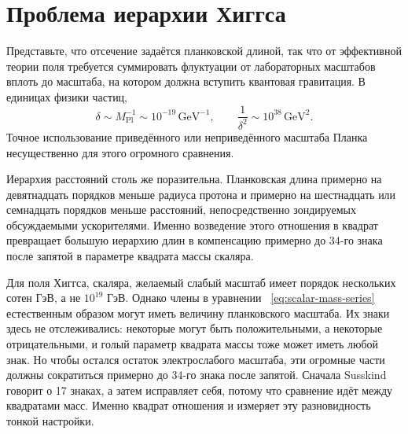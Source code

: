 \section{Проблема иерархии Хиггса}

Представьте, что отсечение задаётся планковской длиной, так что от эффективной теории поля требуется суммировать флуктуации от лабораторных масштабов вплоть до масштаба, на котором должна вступить квантовая гравитация.
В единицах физики частиц,
\begin{equation}
\delta\sim M_{\mathrm{Pl}}^{-1}\sim10^{-19}\,\mathrm{GeV}^{-1},
\qquad
\frac{1}{\delta^2}\sim10^{38}\,\mathrm{GeV}^2.
\label{eq:planck-cutoff}
\end{equation}
Точное использование приведённого или неприведённого масштаба Планка несущественно для этого огромного сравнения.

Иерархия расстояний столь же поразительна. Планковская длина примерно на девятнадцать порядков меньше радиуса протона и примерно на шестнадцать или семнадцать порядков меньше расстояний, непосредственно зондируемых обсуждаемыми ускорителями. Именно возведение этого отношения в квадрат превращает большую иерархию длин в компенсацию примерно до 34-го знака после запятой в параметре квадрата массы скаляра.

Для поля Хиггса, скаляра, желаемый слабый масштаб имеет порядок нескольких сотен ГэВ, а не \(10^{19}\) ГэВ. Однако члены в уравнении ~\eqref{eq:scalar-mass-series} естественным образом могут иметь величину планковского масштаба. Их знаки здесь не отслеживались: некоторые могут быть положительными, а некоторые отрицательными, и голый параметр квадрата массы тоже может иметь любой знак. Но чтобы остался остаток электрослабого масштаба, эти огромные части должны сократиться примерно до 34-го знака после запятой. Сначала Susskind говорит о 17 знаках, а затем исправляет себя, потому что сравнение идёт между квадратами масс. Именно квадрат отношения и измеряет эту разновидность тонкой настройки.

\begin{classroomqa}
\end{classroomqa}

